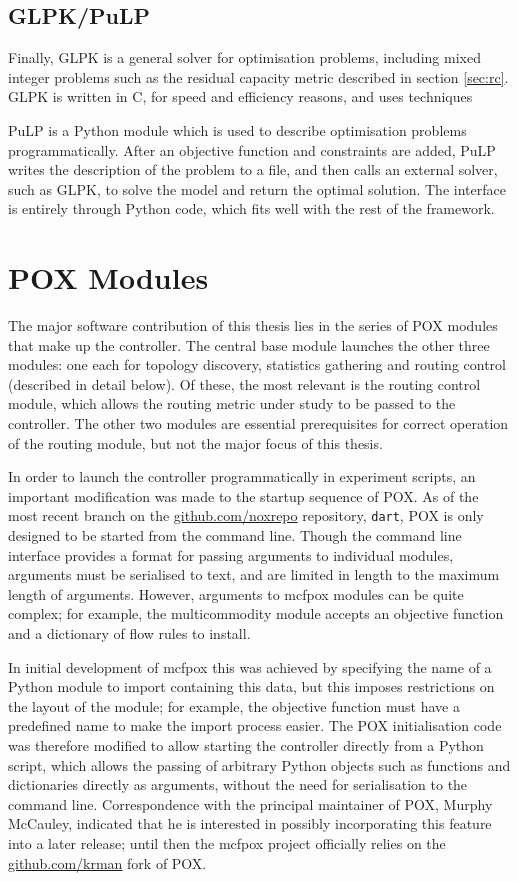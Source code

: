 \subsection{GLPK/PuLP}
Finally, GLPK is a general solver for optimisation problems, including mixed integer problems such as the residual capacity metric described in section \ref{sec:rc}. GLPK is written in C, for speed and efficiency reasons, and uses techniques 

PuLP is a Python module which is used to describe optimisation problems programmatically. After an objective function and constraints are added, PuLP writes the description of the problem to a file, and then calls an external solver, such as GLPK, to solve the model and return the optimal solution. The interface is entirely through Python code, which fits well with the rest of the framework.

\section{POX Modules}
The major software contribution of this thesis lies in the series of POX modules that make up the \thesis{} controller. The central base module launches the other three modules: one each for topology discovery, statistics gathering and routing control (described in detail below). Of these, the most relevant is the routing control module, which allows the routing metric under study to be passed to the controller. The other two modules are essential prerequisites for correct operation of the routing module, but not the major focus of this thesis.

In order to launch the controller programmatically in experiment scripts, an important modification was made to the startup sequence of POX. As of the most recent branch on the \url{github.com/noxrepo} repository, \texttt{dart}, POX is only designed to be started from the command line. Though the command line interface provides a format for passing arguments to individual modules, arguments must be serialised to text, and are limited in length to the maximum length of arguments. However, arguments to mcfpox modules can be quite complex; for example, the multicommodity module accepts an objective function and a dictionary of flow rules to install.

In initial development of mcfpox this was achieved by specifying the name of a Python module to import containing this data, but this imposes restrictions on the layout of the module; for example, the objective function must have a predefined name to make the import process easier. The POX initialisation code was therefore modified to allow starting the controller directly from a Python script, which allows the passing of arbitrary Python objects such as functions and dictionaries directly as arguments, without the need for serialisation to the command line. Correspondence with the principal maintainer of POX, Murphy McCauley, indicated that he is interested in possibly incorporating this feature into a later release; until then the mcfpox project officially relies on the \url{github.com/krman} fork of POX. 


